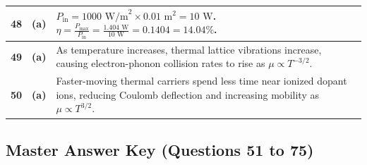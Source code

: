 {\begin{tabularx}{\textwidth}{|c|c|X|}
\textbf{48} & \textbf{(a)} & $P_{\text{in}} = 1000\text{ W/m}^2 \times 0.01\text{ m}^2 = 10\text{ W}$. $\eta = \frac{P_{\text{max}}}{P_{\text{in}}} = \frac{1.404\text{ W}}{10\text{ W}} = 0.1404 = 14.04\%$. \\ \hline
\textbf{49} & \textbf{(a)} & As temperature increases, thermal lattice vibrations increase, causing electron-phonon collision rates to rise as $\mu \propto T^{-3/2}$. \\ \hline
\textbf{50} & \textbf{(a)} & Faster-moving thermal carriers spend less time near ionized dopant ions, reducing Coulomb deflection and increasing mobility as $\mu \propto T^{3/2}$. \\ \hline
\end{tabularx}
}

\newpage

\subsection*{Master Answer Key (Questions 51 to 75)}

